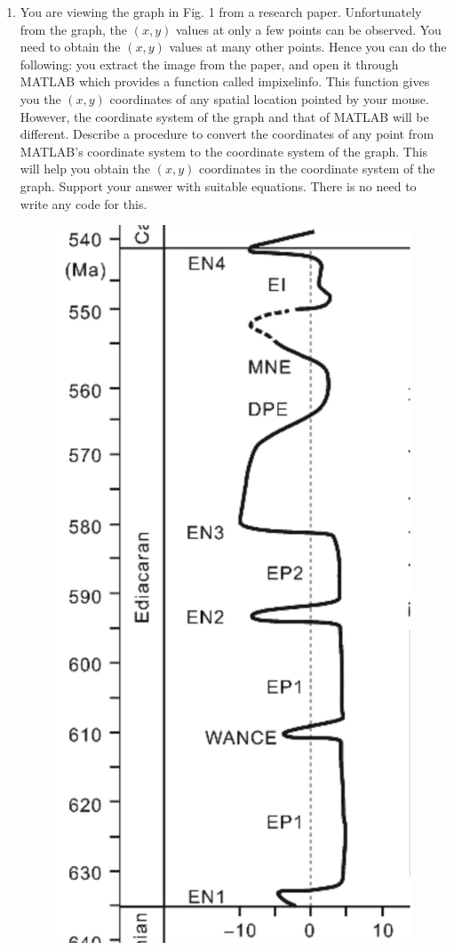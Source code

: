\documentclass[11pt]{article}
\begin{document}
\begin{enumerate}
\item You are viewing the graph in Fig. 1 from a research paper. Unfortunately from the graph, the $(x,y)$ values at only a few points can be observed. You need to obtain the $(x,y)$ values at many other points. Hence you can do the following: you extract the image from the paper, and open it through MATLAB which provides a function called impixelinfo. This function gives you the $(x,y)$ coordinates of any spatial location pointed by your mouse. However, the coordinate system of the graph and that of MATLAB will be different. Describe a procedure to convert the coordinates of any point from MATLAB's coordinate system to the coordinate system of the graph. This will help you obtain the $(x,y)$ coordinates in the coordinate system of the graph. Support your answer with suitable equations. There is no need to write any code for this. 
\begin{figure}
\includegraphics[scale=0.15]{graph.jpeg}

\end{figure}
\end{enumerate}
\end{document}
